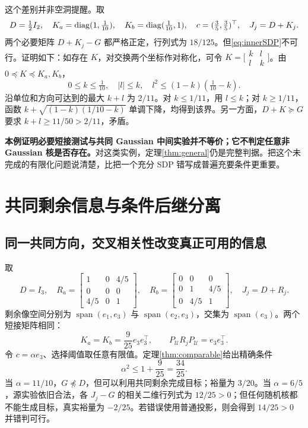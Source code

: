 \documentclass[UTF8,fontset=fandol,zihao=5,a4paper]{ctexart}
\theoremstyle{definition}
\theoremstyle{remark}\newtheorem{remark}[theorem]{说明}
\numberwithin{equation}{section}
\begin{document}
这个差别并非空洞提醒。取
\begin{equation}
D=\tfrac12I_2,\quad
K_a=\operatorname{diag}(1,\tfrac1{10}),\quad
K_b=\operatorname{diag}(\tfrac1{10},1),\quad c=(\tfrac35,\tfrac35)^\top,
\quad J_j=D+K_j.
\label{eq:gap}
\end{equation}
两个必要矩阵 $D+K_j-G$ 都严格正定，行列式为 $18/125$。但\eqref{eq:innerSDP}不可行。证明如下：如存在 $K$，对交换两个坐标作对称化，可令 $K=\bigl[\begin{smallmatrix}k&l\\l&k\end{smallmatrix}\bigr]$。由 $0\preceq K\preceq K_a,K_b$，
\[
0\le k\le\tfrac1{10},\quad |l|\le k,
\quad l^2\le(1-k)(\tfrac1{10}-k).
\]
沿单位和方向可达到的最大 $k+l$ 为 $2/11$。对 $k\le1/11$，用 $l\le k$；对 $k\ge1/11$，函数 $k+\sqrt{(1-k)(1/10-k)}$ 单调下降，均得到该界。另一方面，$D+K\succeq G$ 要求 $k+l\ge11/50>2/11$，矛盾。

\textbf{本例证明必要短接测试与共同 Gaussian 中间实验并不等价；它不判定任意非 Gaussian 核是否存在。}对这类实例，定理\ref{thm:general}仍是完整判据。把这个未完成的有限化问题说清楚，比把一个充分 SDP 错写成普遍充要条件更重要。

\section{共同剩余信息与条件后继分离}
\label{sec:examples}
\subsection{同一共同方向，交叉相关性改变真正可用的信息}
取
\begin{equation}
D=I_3,\quad R_a=\begin{bmatrix}1&0&4/5\\0&0&0\\4/5&0&1\end{bmatrix},\quad
R_b=\begin{bmatrix}0&0&0\\0&1&4/5\\0&4/5&1\end{bmatrix},\quad J_j=D+R_j.
\label{eq:threeD}
\end{equation}
剩余像空间分别为 $\operatorname{span}(e_1,e_3)$ 与 $\operatorname{span}(e_2,e_3)$，交集为 $\operatorname{span}(e_3)$。两个短接矩阵相同：
\begin{equation}
K_a=K_b=\frac9{25}e_3e_3^\top,
\qquad P_{\mathcal U}R_jP_{\mathcal U}=e_3e_3^\top.
\end{equation}
令 $c=\alpha e_3$、选择阈值取任意有限值。定理\ref{thm:comparable}给出精确条件
\begin{equation}
\boxed{\alpha^2\le1+\frac9{25}=\frac{34}{25}.}
\end{equation}
当 $\alpha=11/10$，$G\npreceq D$，但可以利用共同剩余完成目标；裕量为 $3/20$。当 $\alpha=6/5$，源实验依旧合法，各 $J_j-G$ 的相关二维行列式为 $12/25>0$；但任何随机核都不能生成目标，真实裕量为 $-2/25$。若错误使用普通投影，则会得到 $14/25>0$ 并错判可行。
\end{document}
